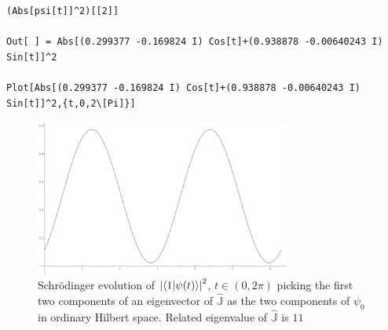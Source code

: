 \begin{lstlisting}
(Abs[psi[t]]^2)[[2]]

Out[ ] = Abs[(0.299377 -0.169824 I) Cos[t]+(0.938878 -0.00640243 I) Sin[t]]^2
  
Plot[Abs[(0.299377 -0.169824 I) Cos[t]+(0.938878 -0.00640243 I) Sin[t]]^2,{t,0,2\[Pi]}]  \end{lstlisting}
\begin{figure}
  \centering
  \includegraphics[width=0.75\textwidth]{img/probB_1.png}
  \caption[(from notebook)]{
    Schr{\"o}dinger evolution of
    $\qty|\braket{1}{\psi(t)}|^2$, $t \in (0, 2\pi) $
    picking the first two components of an eigenvector of $\hat{\mathbb{J}}$
    as the two components of $\psi_0$ in ordinary Hilbert space.
    Related eigenvalue of $\hat{\mathbb{J}}$ is $11$
  }
\end{figure}
